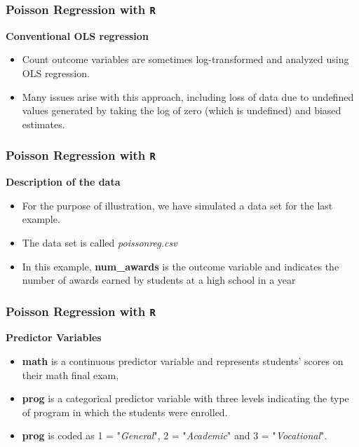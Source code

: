\documentclass[00-GLMregslides.tex]{subfiles}
\begin{document}
\begin{frame}[fragile]
	
	\frametitle{Poisson Regression with \texttt{R}}
	\Large
	\textbf{Conventional OLS regression}
	\begin{itemize}
		\item Count outcome variables are sometimes log-transformed and analyzed using OLS regression. 
		\item Many issues arise with this approach, including loss of data due to undefined values generated by taking the log of zero (which is undefined) and biased estimates.
	\end{itemize}
	\bigskip
\end{frame}

\begin{frame}[fragile]

\frametitle{Poisson Regression with \texttt{R}}
\Large
\textbf{Description of the data}

\begin{itemize}
\item For the purpose of illustration, we have simulated a data set for the last example.

\item The data set is called \textit{poissonreg.csv}  

\item In this example, \textbf{num\_awards} is the outcome variable and indicates the number of awards earned by students at a high school in a year

\end{itemize}
\end{frame}
\begin{frame}[fragile]
	
	\frametitle{Poisson Regression with \texttt{R}}
	\Large
	\textbf{Predictor Variables}
\begin{itemize}
\item \textbf{math} is a continuous predictor variable and represents students' scores on their math final exam, \item \textbf{prog} is a categorical predictor variable with three levels indicating the type of program in which the students were enrolled.

\item  \textbf{prog} is coded as 1 = "\textit{General}",
 2 = "\textit{Academic}" and 3 = "\textit{Vocational}". 
\end{itemize}

\end{frame}
\end{document}
